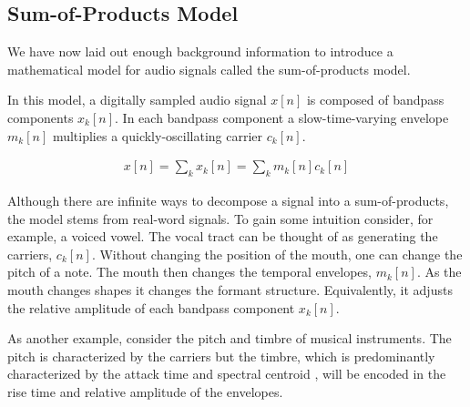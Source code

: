 \documentclass [11pt, proquest,oneside] {ganter_thesis}[2015/03/03]
\begin{document}
\subsection{Sum-of-Products Model}

We have now laid out enough background information to introduce a mathematical model for audio signals called the sum-of-products model.

In this model, a digitally sampled audio signal $x[n]$ is composed of bandpass components $x_k[n]$.  In each bandpass component a slow-time-varying envelope $m_k[n]$ multiplies a quickly-oscillating carrier $c_k[n]$.

\begin{align}
\label{eq:sum-of-products}
x[n] = \sum\limits_k x_k[n] = \sum\limits_k m_k[n] c_k[n]
\end{align}

Although there are infinite ways to decompose a signal into a sum-of-products, the model stems from real-word signals.  To gain some intuition consider, for example, a voiced vowel.  The vocal tract can be thought of as generating the carriers, $c_k[n]$.  Without changing the position of the mouth, one can change the pitch of a note.  The mouth then changes the temporal envelopes, $m_k[n]$.  As the mouth changes shapes it changes the formant structure.  Equivalently, it adjusts the relative amplitude of each bandpass component $x_k[n]$.

As another example, consider the pitch and timbre of musical instruments.  The pitch is characterized by the carriers but the timbre, which is predominantly characterized by the attack time and spectral centroid \cite{kong2011temporal}, will be encoded in the rise time and relative amplitude of the envelopes.

\end{document}
